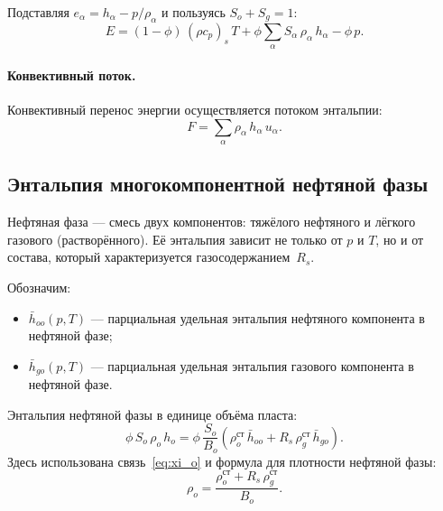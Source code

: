 \documentclass[12pt,a4paper]{article}
\begin{document}
Подставляя $e_\alpha = h_\alpha - p/\rho_\alpha$ и пользуясь
$S_o + S_g = 1$:
\begin{equation}\label{eq:E_expanded}
  E = (1 - \phi)\,(\rho c_p)_s\,T
      + \phi\sum_\alpha S_\alpha\,\rho_\alpha\,h_\alpha
      - \phi\,p.
\end{equation}

\paragraph{Конвективный поток.}
Конвективный перенос энергии осуществляется потоком энтальпии:
\begin{equation}\label{eq:F_total}
  F = \sum_\alpha \rho_\alpha\,h_\alpha\,u_\alpha.
\end{equation}

\subsection{Энтальпия многокомпонентной нефтяной фазы}\label{ssec:enthalpy_oil}

Нефтяная фаза --- смесь двух компонентов: тяжёлого нефтяного и лёгкого
газового (растворённого). Её энтальпия зависит не только от $p$ и $T$,
но и от состава, который характеризуется газосодержанием~$R_s$.

Обозначим:
\begin{itemize}[nosep]
  \item $\bar{h}_{oo}(p,T)$ --- парциальная удельная энтальпия
        нефтяного компонента в нефтяной фазе;
  \item $\bar{h}_{go}(p,T)$ --- парциальная удельная энтальпия
        газового компонента в нефтяной фазе.
\end{itemize}

Энтальпия нефтяной фазы в единице объёма пласта:
\begin{equation}\label{eq:oil_enthalpy_components}
  \phi\,S_o\,\rho_o\,h_o
  = \phi\,\frac{S_o}{B_o}\!\left(
      \rho_o^{\text{ст}}\,\bar{h}_{oo}
      + R_s\,\rho_g^{\text{ст}}\,\bar{h}_{go}
    \right).
\end{equation}
Здесь использована связь~\eqref{eq:xi_o} и формула для плотности
нефтяной фазы:
\begin{equation}\label{eq:rho_oil}
  \rho_o = \frac{\rho_o^{\text{ст}} + R_s\,\rho_g^{\text{ст}}}{B_o}.
\end{equation}
\end{document}

